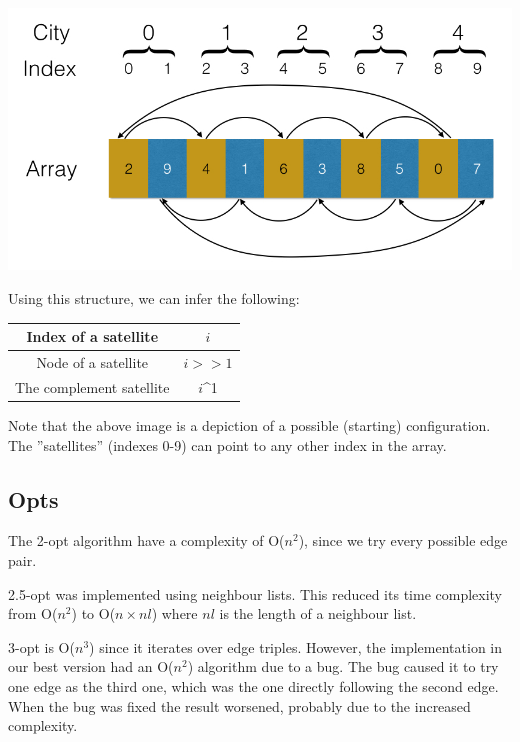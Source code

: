 \documentclass[paper=a4, fontsize=11pt,numbers=endperiod]{scrartcl} %
\numberwithin{equation}{section} %
\numberwithin{figure}{section} %
\numberwithin{table}{section} %
\begin{document}
\begin{center}
\includegraphics[scale=0.3]{satellite}
\end{center}

Using this structure, we can infer the following:\\
\begin{table}[h]
  \centering
  \begin{tabular}{|c|c|}
    \hline
    Index of a satellite & $i$ \\ \hline
    Node of a satellite & $i>>1$ \\ \hline
    The complement satellite & $i$\^{}1 \\ \hline
  \end{tabular}
\end{table}


Note that the above image is a depiction of a possible (starting) configuration. The ''satellites'' (indexes 0-9) can point to any other index in the array.

\subsection{Opts}
The 2-opt algorithm have a complexity of O($n^2$), since we try every possible edge pair.

2.5-opt was implemented using neighbour lists.
This reduced its time complexity from O($n^2$) to O($n\times nl$) where $nl$ is the length of a neighbour list.

3-opt is O($n^3$) since it iterates over edge triples.
However, the implementation in our best version had an O($n^2$) algorithm due to a bug.
The bug caused it to try one edge as the third one, which was the one directly following the second edge.
When the bug was fixed the result worsened, probably due to the increased complexity.
\end{document}
